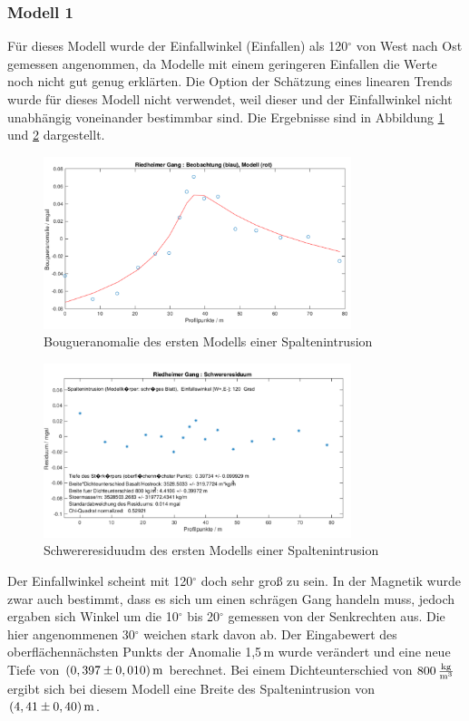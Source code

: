 \subsubsection{Modell 1}

Für dieses Modell wurde der Einfallwinkel (Einfallen) als 120$^\circ$ von West nach Ost gemessen angenommen, da Modelle mit einem geringeren Einfallen die Werte noch nicht gut genug erklärten. Die Option der Schätzung eines linearen Trends wurde für dieses Modell nicht verwendet, weil dieser und der Einfallwinkel nicht unabhängig voneinander bestimmbar sind. Die Ergebnisse sind in Abbildung \ref{fig:modell1} und \ref{fig:modell1_res} dargestellt.

\begin{figure}[!ht]
 \centering
 \includegraphics[width=0.8\textwidth]{fig/modell1}
 \caption{Bougueranomalie des ersten Modells einer Spaltenintrusion}
 \label{fig:modell1}
\end{figure}

\begin{figure}[!ht]
 \centering
 \includegraphics[width=0.8\textwidth]{fig/modell1_res}
 \caption{Schwereresiduudm des ersten Modells einer Spaltenintrusion}
 \label{fig:modell1_res}
\end{figure}

Der Einfallwinkel scheint mit 120$^\circ$ doch sehr groß zu sein. In der Magnetik wurde zwar auch bestimmt, dass es sich um einen schrägen Gang handeln muss, jedoch ergaben sich Winkel um die 10$^\circ$ bis 20$^\circ$ gemessen von der Senkrechten aus. Die hier angenommenen 30$^\circ$ weichen stark davon ab. Der Eingabewert des oberflächennächsten Punkts der Anomalie 1,5\,m wurde verändert und eine neue Tiefe von $(0,397\pm0,010)\,\mathrm{m}$ berechnet. Bei einem Dichteunterschied von $800\,\frac{\mathrm{kg}}{\mathrm{m^3}}$ ergibt sich bei diesem Modell eine Breite des Spaltenintrusion von $(4,41\pm0,40)\,\mathrm{m}$.

